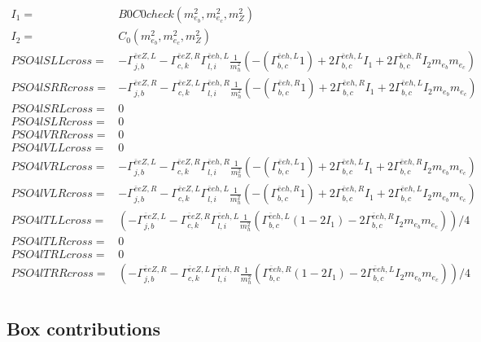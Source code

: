 \documentclass[A4,landscape]{article}
\begin{document}
\begin{align} 
I_1= & B0C0check(m^2_{e_{{b}}}, m^2_{e_{{c}}}, m^2_{Z}) \\ 
I_2= & C_0(m^2_{e_{{b}}}, m^2_{e_{{c}}}, m^2_{Z}) \\ 
  PSO4lSLLcross= &  - \Gamma^{\bar{e}e Z ,L} _{j, b} - \Gamma^{\bar{e}e Z ,R} _{c, k} \Gamma^{\bar{e}e h ,L}_{l, i} \frac{1}{m^2_{h}} (-(\Gamma^{\bar{e}e h ,L}_{b, c} 1) + 2 \Gamma^{\bar{e}e h ,L}_{b, c} I_1 + 2 \Gamma^{\bar{e}e h ,R}_{b, c} I_2 m_{e_{{b}}} m_{e_{{c}}}) \\ 
  PSO4lSRRcross= &  - \Gamma^{\bar{e}e Z ,R} _{j, b} - \Gamma^{\bar{e}e Z ,L} _{c, k} \Gamma^{\bar{e}e h ,R}_{l, i} \frac{1}{m^2_{h}} (-(\Gamma^{\bar{e}e h ,R}_{b, c} 1) + 2 \Gamma^{\bar{e}e h ,R}_{b, c} I_1 + 2 \Gamma^{\bar{e}e h ,L}_{b, c} I_2 m_{e_{{b}}} m_{e_{{c}}}) \\ 
  PSO4lSRLcross= & 0 \\ 
  PSO4lSLRcross= & 0 \\ 
  PSO4lVRRcross= & 0 \\ 
  PSO4lVLLcross= & 0 \\ 
  PSO4lVRLcross= &  - \Gamma^{\bar{e}e Z ,L} _{j, b} - \Gamma^{\bar{e}e Z ,R} _{c, k} \Gamma^{\bar{e}e h ,R}_{l, i} \frac{1}{m^2_{h}} (-(\Gamma^{\bar{e}e h ,L}_{b, c} 1) + 2 \Gamma^{\bar{e}e h ,L}_{b, c} I_1 + 2 \Gamma^{\bar{e}e h ,R}_{b, c} I_2 m_{e_{{b}}} m_{e_{{c}}}) \\ 
  PSO4lVLRcross= &  - \Gamma^{\bar{e}e Z ,R} _{j, b} - \Gamma^{\bar{e}e Z ,L} _{c, k} \Gamma^{\bar{e}e h ,L}_{l, i} \frac{1}{m^2_{h}} (-(\Gamma^{\bar{e}e h ,R}_{b, c} 1) + 2 \Gamma^{\bar{e}e h ,R}_{b, c} I_1 + 2 \Gamma^{\bar{e}e h ,L}_{b, c} I_2 m_{e_{{b}}} m_{e_{{c}}}) \\ 
  PSO4lTLLcross= & ( - \Gamma^{\bar{e}e Z ,L} _{j, b} - \Gamma^{\bar{e}e Z ,R} _{c, k} \Gamma^{\bar{e}e h ,L}_{l, i} \frac{1}{m^2_{h}} (\Gamma^{\bar{e}e h ,L}_{b, c} (1 - 2 I_1) - 2 \Gamma^{\bar{e}e h ,R}_{b, c} I_2 m_{e_{{b}}} m_{e_{{c}}}))/4 \\ 
  PSO4lTLRcross= & 0 \\ 
  PSO4lTRLcross= & 0 \\ 
  PSO4lTRRcross= & ( - \Gamma^{\bar{e}e Z ,R} _{j, b} - \Gamma^{\bar{e}e Z ,L} _{c, k} \Gamma^{\bar{e}e h ,R}_{l, i} \frac{1}{m^2_{h}} (\Gamma^{\bar{e}e h ,R}_{b, c} (1 - 2 I_1) - 2 \Gamma^{\bar{e}e h ,L}_{b, c} I_2 m_{e_{{b}}} m_{e_{{c}}}))/4 \\ 
\end{align} 
\subsection{Box contributions} 
\end{document}
